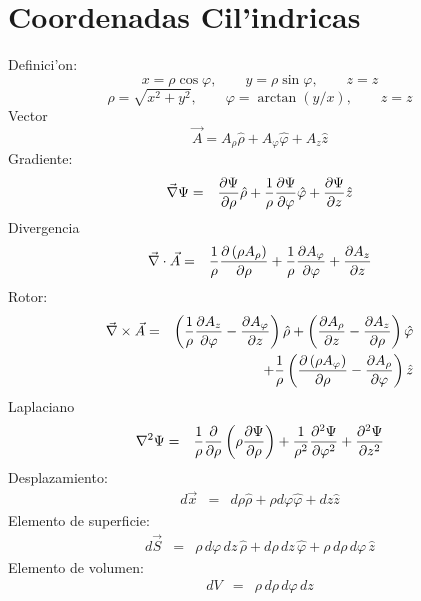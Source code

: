 \section{Coordenadas Cil'indricas}
Definici'on:
\begin{equation}
    x  =  \rho\cos\varphi , \qquad
    y  =  \rho\sin\varphi , \qquad
    z =  z
\end{equation}
\begin{equation}
    \rho  =  \sqrt{x^2 + y^2} , \qquad
    \varphi  = \arctan{(y/x)}, \qquad
     z=  z
\end{equation}
Vector
\begin{equation}
\vec{A} =A_\rho {\hat \rho} + A_\varphi {\hat \varphi} +
A_z {\hat z}
\end{equation}
Gradiente:
\begin{eqnarray}
 \vec\nabla\Psi&=&{\partial\Psi\over \partial \rho} {\hat \rho}
  + {1 \over \rho}{\partial\Psi\over \partial \varphi} {\hat \varphi}
  + {\partial\Psi\over \partial z} {\hat z}
\end{eqnarray}
Divergencia
\begin{eqnarray}
 \vec\nabla \cdot \vec{A}
&=&  {1 \over \rho}{\partial \left( \rho A_\rho  \right) \over \partial
\rho}  + {1 \over \rho}{\partial A_\varphi \over \partial \varphi}
  + {\partial A_z \over \partial z}
\end{eqnarray}
Rotor:
\begin{eqnarray}
\vec\nabla \times  \vec{A}
&=&   \left({1 \over \rho}{\partial A_z \over \partial \varphi}
    - {\partial A_\varphi \over \partial z}\right)  {\hat \rho} +
\left({\partial A_\rho \over \partial z} - {\partial A_z \over
\partial \rho}\right)  {\hat \varphi} \nonumber\\
&&+  {1 \over \rho}\left({\partial \left( \rho A_\varphi \right) \over
\partial \rho}     - {\partial A_\rho \over \partial \varphi}\right) {\hat z}
\end{eqnarray}
Laplaciano
\begin{eqnarray}
 \nabla^2 \Psi
&=& {1 \over \rho}{\partial \over \partial \rho}\left(\rho {\partial\Psi\over
\partial \rho}\right)
  + {1 \over \rho^2}{\partial^2\Psi\over \partial \varphi^2}
  + {\partial^2\Psi\over \partial z^2} \\
\end{eqnarray}
Desplazamiento:
\begin{eqnarray}
 d \vec{x}
 &=& d\rho {\hat \rho} + \rho d\varphi {\hat \varphi} +dz {\hat z}
\end{eqnarray}
Elemento de superficie:
\begin{eqnarray}
 d \vec{S}
&=& \rho\, d\varphi\, dz\, {\hat \rho} + d\rho
\,dz\, {\hat \varphi} +  \rho \,d\rho\, d\varphi \, {\hat z}
\end{eqnarray}
Elemento de volumen:
\begin{eqnarray}
 dV
 &=& \rho\, d\rho\, d\varphi\, dz
\end{eqnarray}

